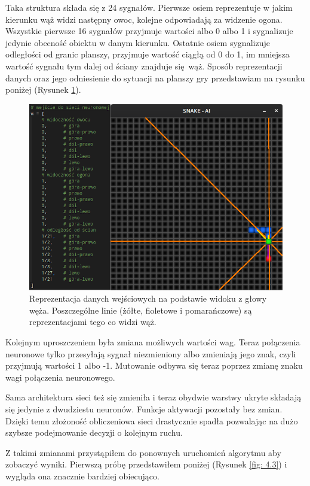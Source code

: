 \documentclass[12pt, oneside, a4paper]{report}
\begin{document}
Taka struktura składa się z 24 sygnałów. Pierwsze osiem reprezentuje w jakim kierunku wąż widzi następny owoc, kolejne odpowiadają za widzenie ogona. Wszystkie pierwsze 16 sygnałów przyjmuje wartości albo 0 albo 1 i sygnalizuje jedynie obecność obiektu w danym kierunku. Ostatnie osiem sygnalizuje odległości od granic planszy, przyjmuje wartość ciągłą od 0 do 1, im mniejsza wartość sygnału tym dalej od ściany znajduje się wąż. Sposób reprezentacji danych oraz jego odniesienie do sytuacji na planszy gry przedstawiam na rysunku poniżej (Rysunek \ref{fig: 4.head-view}).

\begin{figure}[h]
	\centering
	\includegraphics[width=13cm]{head-view.png}
	\caption{Reprezentacja danych wejściowych na podstawie widoku z głowy węża. Poszczególne linie (żółte, fioletowe i pomarańczowe) są reprezentacjami tego co widzi wąż.}
	\label{fig: 4.head-view}
\end{figure}

Kolejnym uproszczeniem była zmiana możliwych wartości wag. Teraz połączenia neuronowe tylko przesyłają sygnał niezmieniony albo zmieniają jego znak, czyli przyjmują wartości 1 albo -1. Mutowanie odbywa się teraz poprzez zmianę znaku wagi połączenia neuronowego.

Sama architektura sieci też się zmieniła i teraz obydwie warstwy ukryte składają się jedynie z dwudziestu neuronów. Funkcje aktywacji pozostały bez zmian. Dzięki temu złożoność obliczeniowa sieci drastycznie spadła pozwalając na dużo szybsze podejmowanie decyzji o kolejnym ruchu.

Z takimi zmianami przystąpiłem do ponownych uruchomień algorytmu aby zobaczyć wyniki. Pierwszą próbę przedstawiłem poniżej (Rysunek \ref{fig: 4.3}) i wygląda ona znacznie bardziej obiecująco.
\newpage
\end{document}
